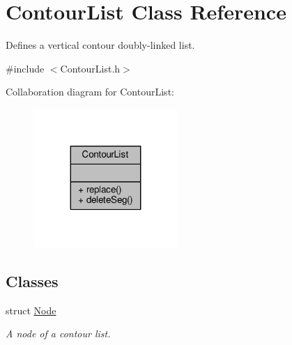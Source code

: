 \hypertarget{classContourList}{}\section{Contour\+List Class Reference}
\label{classContourList}


Defines a vertical contour doubly-\/linked list.  




{\ttfamily \#include $<$Contour\+List.\+h$>$}



Collaboration diagram for Contour\+List\+:\nopagebreak
\begin{figure}[H]
\begin{center}
\leavevmode
\includegraphics[width=155pt]{classContourList__coll__graph}
\end{center}
\end{figure}
\subsection*{Classes}
\begin{DoxyCompactItemize}
\item 
struct \hyperlink{structContourList_1_1Node}{Node}
\begin{DoxyCompactList}\small\item\em A node of a contour list. \end{DoxyCompactList}\end{DoxyCompactItemize}
